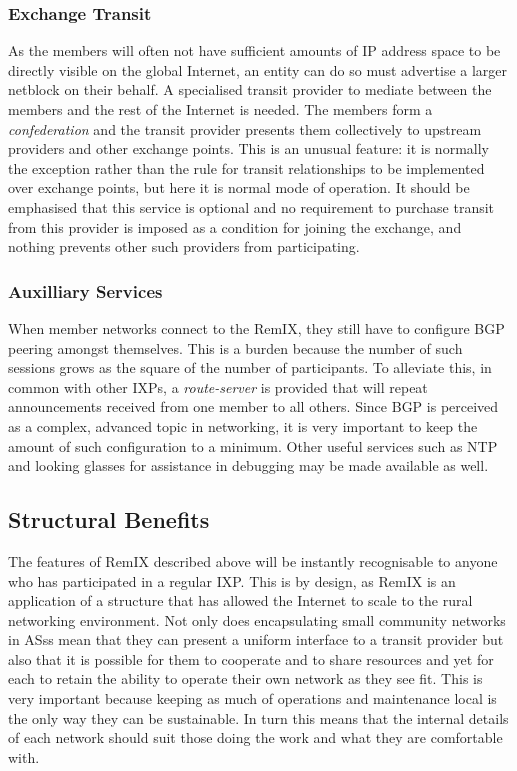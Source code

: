 \subsubsection{Exchange Transit}
As the members will often not have sufficient amounts of IP address
space to be directly visible on the global Internet, an entity
can do so must advertise a larger netblock on their behalf. A
specialised transit provider to mediate between the members and the
rest of the Internet is needed. The members form a
\emph{confederation} and the transit provider presents them
collectively to upstream providers and other exchange points. This is
an unusual feature: it is normally the exception rather than the rule
for transit relationships to be implemented over exchange points, but
here it is normal mode of operation. It should be emphasised that this
service is optional and no requirement to purchase transit from this
provider is imposed as a condition for joining the exchange, and
nothing prevents other such providers from participating.

\subsubsection{Auxilliary Services}
When member networks connect to the RemIX, they still have to
configure \ac{BGP} peering amongst themselves. This is a burden
because the number of such sessions grows as the square of the number
of participants. To alleviate this, in common with other \acp{IXP}, a
\emph{route-server} is provided that will repeat announcements
received from one member to all others. Since \ac{BGP} is perceived as
a complex, advanced topic in networking, it is very important to keep
the amount of such configuration to a minimum. Other useful services
such as \ac{NTP} and looking glasses for assistance in debugging may
be made available as well.

\subsection{Structural Benefits}

The features of RemIX described above will be instantly recognisable
to anyone who has participated in a regular \ac{IXP}. This is by
design, as RemIX is an application of a structure that has allowed the
Internet to scale to the rural networking environment. Not only does
encapsulating small community networks in \acp{AS}s mean that they can
present a uniform interface to a transit provider but also that it is
possible for them to cooperate and to share resources and yet for each
to retain the ability to operate their own network as they see
fit. This is very important because keeping as much of operations and
maintenance local is the only way they can be sustainable. In turn
this means that the internal details of each network should suit those
doing the work and what they are comfortable with.

